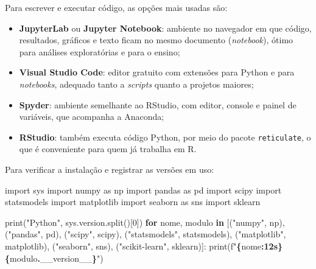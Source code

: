 \documentclass[
]{book}
\newenvironment{Shaded}{\begin{snugshade}}{\end{snugshade}}
\newcommand{\BuiltInTok}[1]{#1}
\newcommand{\ControlFlowTok}[1]{\textcolor[rgb]{0.13,0.29,0.53}{\textbf{#1}}}
\newcommand{\DecValTok}[1]{\textcolor[rgb]{0.00,0.00,0.81}{#1}}
\newcommand{\ImportTok}[1]{#1}
\newcommand{\KeywordTok}[1]{\textcolor[rgb]{0.13,0.29,0.53}{\textbf{#1}}}
\newcommand{\NormalTok}[1]{#1}
\newcommand{\SpecialCharTok}[1]{\textcolor[rgb]{0.81,0.36,0.00}{\textbf{#1}}}
\newcommand{\SpecialStringTok}[1]{\textcolor[rgb]{0.31,0.60,0.02}{#1}}
\newcommand{\StringTok}[1]{\textcolor[rgb]{0.31,0.60,0.02}{#1}}
\providecommand{\tightlist}{%
  \setlength{\itemsep}{0pt}\setlength{\parskip}{0pt}}
\begin{document}
Para escrever e executar código, as opções mais usadas são:

\begin{itemize}
\tightlist
\item
  \textbf{JupyterLab} ou \textbf{Jupyter Notebook}: ambiente no navegador em que código, resultados, gráficos e texto ficam no mesmo documento (\emph{notebook}), ótimo para análises exploratórias e para o ensino;
\item
  \textbf{Visual Studio Code}: editor gratuito com extensões para Python e para \emph{notebooks}, adequado tanto a \emph{scripts} quanto a projetos maiores;
\item
  \textbf{Spyder}: ambiente semelhante ao RStudio, com editor, console e painel de variáveis, que acompanha a Anaconda;
\item
  \textbf{RStudio}: também executa código Python, por meio do pacote \texttt{reticulate}, o que é conveniente para quem já trabalha em R.
\end{itemize}

Para verificar a instalação e registrar as versões em uso:

\begin{Shaded}
\begin{Highlighting}[]
\ImportTok{import}\NormalTok{ sys}
\ImportTok{import}\NormalTok{ numpy }\ImportTok{as}\NormalTok{ np}
\ImportTok{import}\NormalTok{ pandas }\ImportTok{as}\NormalTok{ pd}
\ImportTok{import}\NormalTok{ scipy}
\ImportTok{import}\NormalTok{ statsmodels}
\ImportTok{import}\NormalTok{ matplotlib}
\ImportTok{import}\NormalTok{ seaborn }\ImportTok{as}\NormalTok{ sns}
\ImportTok{import}\NormalTok{ sklearn}

\BuiltInTok{print}\NormalTok{(}\StringTok{"Python"}\NormalTok{, sys.version.split()[}\DecValTok{0}\NormalTok{])}
\ControlFlowTok{for}\NormalTok{ nome, modulo }\KeywordTok{in}\NormalTok{ [(}\StringTok{"numpy"}\NormalTok{, np), (}\StringTok{"pandas"}\NormalTok{, pd), (}\StringTok{"scipy"}\NormalTok{, scipy),}
\NormalTok{                     (}\StringTok{"statsmodels"}\NormalTok{, statsmodels), (}\StringTok{"matplotlib"}\NormalTok{, matplotlib),}
\NormalTok{                     (}\StringTok{"seaborn"}\NormalTok{, sns), (}\StringTok{"scikit{-}learn"}\NormalTok{, sklearn)]:}
    \BuiltInTok{print}\NormalTok{(}\SpecialStringTok{f"}\SpecialCharTok{\{}\NormalTok{nome}\SpecialCharTok{:12s\}}\SpecialStringTok{ }\SpecialCharTok{\{}\NormalTok{modulo}\SpecialCharTok{.}\NormalTok{\_\_version\_\_}\SpecialCharTok{\}}\SpecialStringTok{"}\NormalTok{)}
\end{Highlighting}
\end{Shaded}
\end{document}
